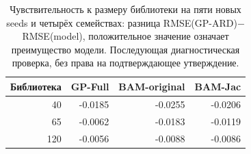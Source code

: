 \begin{table}[htbp]\centering\small
\caption{Чувствительность к размеру библиотеки на пяти новых seeds и четырёх семействах: разница RMSE(GP-ARD)$-$RMSE(model), положительное значение означает преимущество модели. Последующая диагностическая проверка, без права на подтверждающее утверждение.}
\label{tab:metric-library}
\begin{tabular}{rrrr}
\toprule
Библиотека & GP-Full & BAM-original & BAM-Jac \\
\midrule
40 & -0.0185 & -0.0255 & -0.0206 \\
65 & -0.0062 & -0.0183 & -0.0119 \\
120 & -0.0056 & -0.0088 & -0.0086 \\
\bottomrule
\end{tabular}
\end{table}
